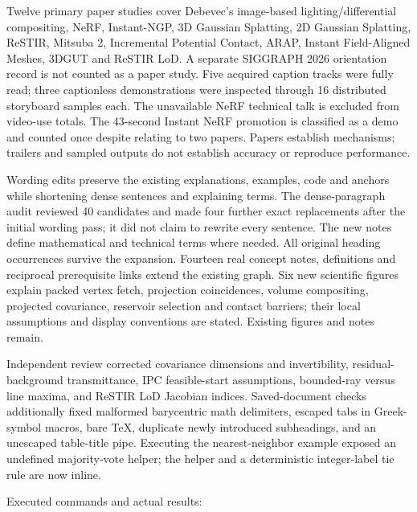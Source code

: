 Twelve primary paper studies cover Debevec's image-based lighting/differential compositing, NeRF, Instant-NGP, 3D Gaussian Splatting, 2D Gaussian Splatting, ReSTIR, Mitsuba 2, Incremental Potential Contact, ARAP, Instant Field-Aligned Meshes, 3DGUT and ReSTIR LoD. A separate SIGGRAPH 2026 orientation record is not counted as a paper study. Five acquired caption tracks were fully read; three captionless demonstrations were inspected through 16 distributed storyboard samples each. The unavailable NeRF technical talk is excluded from video-use totals. The 43-second Instant NeRF promotion is classified as a demo and counted once despite relating to two papers. Papers establish mechanisms; trailers and sampled outputs do not establish accuracy or reproduce performance.

Wording edits preserve the existing explanations, examples, code and anchors while shortening dense sentences and explaining terms. The dense-paragraph audit reviewed 40 candidates and made four further exact replacements after the initial wording pass; it did not claim to rewrite every sentence. The new notes define mathematical and technical terms where needed. All original heading occurrences survive the expansion. Fourteen real concept notes, definitions and reciprocal prerequisite links extend the existing graph. Six new scientific figures explain packed vertex fetch, projection coincidences, volume compositing, projected covariance, reservoir selection and contact barriers; their local assumptions and display conventions are stated. Existing figures and notes remain.

Independent review corrected covariance dimensions and invertibility, residual-background transmittance, IPC feasible-start assumptions, bounded-ray versus line maxima, and ReSTIR LoD Jacobian indices. Saved-document checks additionally fixed malformed barycentric math delimiters, escaped tabs in Greek-symbol macros, bare TeX, duplicate newly introduced subheadings, and an unescaped table-title pipe. Executing the nearest-neighbor example exposed an undefined majority-vote helper; the helper and a deterministic integer-label tie rule are now inline.

Executed commands and actual results:

